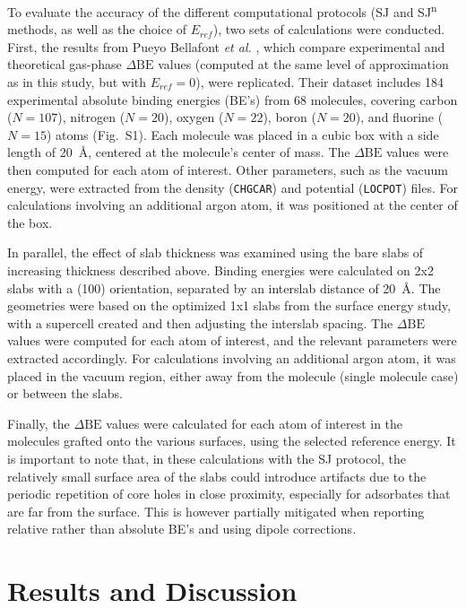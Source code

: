 \documentclass[journal=jpccck,manuscript=article]{achemso}
\def\dbe{\ensuremath{\Delta\text{BE}}}
\begin{document}
To evaluate the accuracy of the different computational protocols (SJ and SJ\textsuperscript{n} methods, as well as the choice of $E_{ref}$), two sets of calculations were conducted. First, the results from Pueyo Bellafont \textit{et al.} \cite{pueyobellafontPredictingCoreLevel2017}, which compare experimental and theoretical gas-phase \dbe{} values (computed at the same level of approximation as in this study, but with $E_{ref}=0$), were replicated. Their dataset includes 184 experimental absolute binding energies (BE's) from 68 molecules, covering carbon ($N=107$), nitrogen ($N=20$), oxygen ($N=22$), boron ($N=20$), and fluorine ($N=15$) atoms (Fig.~S1). Each molecule was placed in a cubic box with a side length of \SI{20}{\angstrom}, centered at the molecule's center of mass. The \dbe{} values were then computed for each atom of interest. Other parameters, such as the vacuum energy, were extracted from the density (\texttt{CHGCAR}) and potential (\texttt{LOCPOT}) files. For calculations involving an additional argon atom, it was positioned at the center of the box.

In parallel, the effect of slab thickness was examined using the bare slabs of increasing thickness described above. Binding energies were calculated on 2x2 slabs with a (100) orientation, separated by an interslab distance of \SI{20}{\angstrom}. The geometries were based on the optimized 1x1 slabs from the surface energy study, with a supercell created and then adjusting the interslab spacing. The \dbe{} values were computed for each atom of interest, and the relevant parameters were extracted accordingly. For calculations involving an additional argon atom, it was placed in the vacuum region, either away from the molecule (single molecule case) or between the slabs.

Finally, the \dbe{} values were calculated for each atom of interest in the molecules grafted onto the various surfaces, using the selected reference energy. It is important to note that, in these calculations with the SJ protocol, the relatively small surface area of the slabs could introduce artifacts due to the periodic repetition of core holes in close proximity, especially for adsorbates that are far from the surface.\cite{taucherFinalStateSimulationsCoreLevel2020} This is however partially mitigated when reporting relative rather than absolute BE's and using dipole corrections.



\section{Results and Discussion}\label{sec:results}
\end{document}
